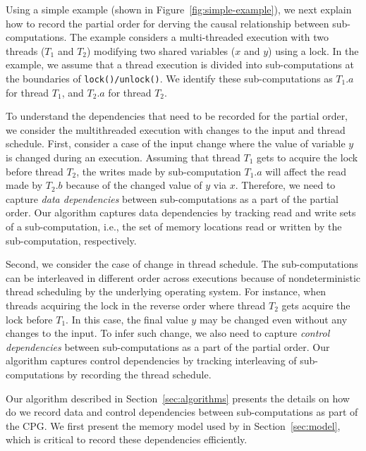 Using a simple example (shown in Figure~\ref{fig:simple-example}), we next explain how to record  the partial order for derving the causal relationship between sub-computations. The example considers a multi-threaded execution with two threads ($T_1$ and $T_2$) modifying two shared variables ($x$ and $y$) using a lock. In the example, we assume that a thread execution is divided into sub-computations at the boundaries of {\tt lock()/unlock()}. We identify these sub-computations as $T_1.a$ for thread $T_1$, and $T_2.a$ for thread $T_2$.  

To understand the dependencies that need to be recorded for the partial order, we consider the multithreaded execution with changes to the input and thread schedule.  First, consider a case of the input change where the value of variable $y$ is changed during an execution. Assuming that thread $T_1$ gets to acquire the lock before thread $T_2$, the writes made by sub-computation $T_1.a$ will affect the read made by $T_2.b$ because of the changed value of $y$ via  $x$. Therefore, we need to capture {\em data dependencies} between sub-computations as a part of the partial order. Our algorithm captures data dependencies by tracking read and write sets of a sub-computation, i.e., the set of memory locations read or written by the sub-computation, respectively.

Second, we consider the case of change in thread schedule. The sub-computations can be interleaved in different order across executions because of nondeterministic thread scheduling by the underlying operating system. For instance, when threads acquiring the lock in the reverse order where thread $T_2$ gets acquire the lock before $T_1$. In this case, the final value $y$ may be changed even without any changes to the input. To infer such change, we also need to capture {\em control dependencies}   between sub-computations as a part of the partial order. Our algorithm captures control dependencies by tracking interleaving of sub-computations by recording the thread schedule. 




Our algorithm described in Section~\ref{sec:algorithms} presents the details on how do we record data and control dependencies between sub-computations as part of the CPG. We first present the memory model used by \projecttitle in Section~\ref{sec:model}, which is critical to record these dependencies efficiently.














 